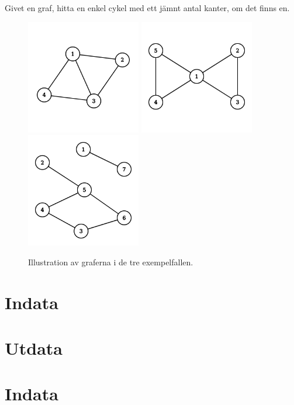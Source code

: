 
Givet en graf, hitta en enkel cykel med ett jämnt antal kanter, om det finns en.


\begin{figure}[!h]
\begin{center}
  \includegraphics[width=5cm]{sample1.png}
  \quad
  \includegraphics[width=5cm]{sample2.png}
  \quad
  \includegraphics[width=5cm]{sample3.png}
\end{center}
  \caption{Illustration av graferna i de tre exempelfallen.}
\end{figure}

\section*{Indata}
\section*{Utdata}
\section*{Indata}

